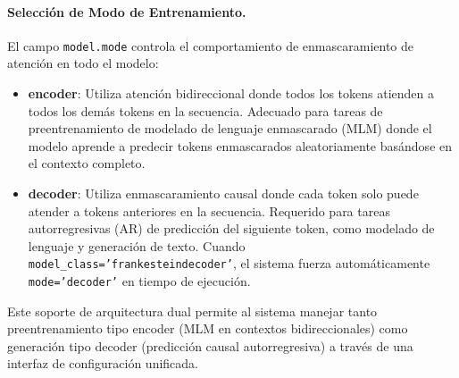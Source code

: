 \documentclass[11pt,a4paper]{article}
\begin{document}
\paragraph{Selección de Modo de Entrenamiento.}
El campo \texttt{model.mode} controla el comportamiento de enmascaramiento de atención en todo el modelo:
\begin{itemize}[leftmargin=*]
    \item \textbf{encoder}: Utiliza atención bidireccional donde todos los tokens atienden a todos los demás tokens en la secuencia. Adecuado para tareas de preentrenamiento de modelado de lenguaje enmascarado (MLM) donde el modelo aprende a predecir tokens enmascarados aleatoriamente basándose en el contexto completo.
    \item \textbf{decoder}: Utiliza enmascaramiento causal donde cada token solo puede atender a tokens anteriores en la secuencia. Requerido para tareas autorregresivas (AR) de predicción del siguiente token, como modelado de lenguaje y generación de texto. Cuando \texttt{model\_class='frankesteindecoder'}, el sistema fuerza automáticamente \texttt{mode='decoder'} en tiempo de ejecución.
\end{itemize}

Este soporte de arquitectura dual permite al sistema manejar tanto preentrenamiento tipo encoder (MLM en contextos bidireccionales) como generación tipo decoder (predicción causal autorregresiva) a través de una interfaz de configuración unificada.
\end{document}
